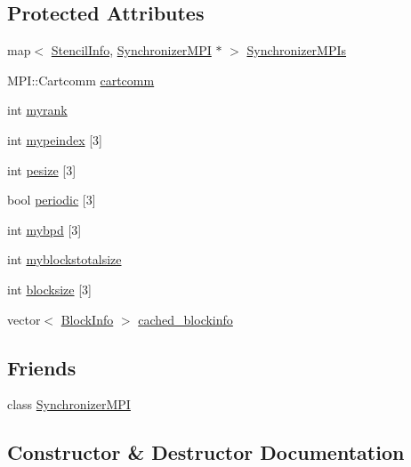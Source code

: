 \subsection*{Protected Attributes}
\begin{DoxyCompactItemize}
\item 
map$<$ \hyperlink{struct_stencil_info}{Stencil\+Info}, \hyperlink{class_synchronizer_m_p_i}{Synchronizer\+M\+P\+I} $\ast$ $>$ \hyperlink{class_grid_m_p_i_a2630fe6ea5a92bc46e122bce621143e5}{Synchronizer\+M\+P\+Is}
\item 
M\+P\+I\+::\+Cartcomm \hyperlink{class_grid_m_p_i_a11225861787838aeb43f9a6be7a5736b}{cartcomm}
\item 
int \hyperlink{class_grid_m_p_i_ac06426dbf8b56ab9f642f38b99a8ff58}{myrank}
\item 
int \hyperlink{class_grid_m_p_i_a18aa2c80d121cc50339949d8c3d0d547}{mypeindex} \mbox{[}3\mbox{]}
\item 
int \hyperlink{class_grid_m_p_i_ad23be40f0e498f46f215c36e0a00546c}{pesize} \mbox{[}3\mbox{]}
\item 
bool \hyperlink{class_grid_m_p_i_a5376cf349ce2d317bddc363907b22f69}{periodic} \mbox{[}3\mbox{]}
\item 
int \hyperlink{class_grid_m_p_i_a18238a13a4e9d9448ff9562560d5eadf}{mybpd} \mbox{[}3\mbox{]}
\item 
int \hyperlink{class_grid_m_p_i_a33aea82975cdfa2b3f017ee35fab6c5b}{myblockstotalsize}
\item 
int \hyperlink{class_grid_m_p_i_a9c0c291e8619844c31afa37d884e7805}{blocksize} \mbox{[}3\mbox{]}
\item 
vector$<$ \hyperlink{struct_block_info}{Block\+Info} $>$ \hyperlink{class_grid_m_p_i_ad5256ab6f6cef049008518d5d2ab7bdb}{cached\+\_\+blockinfo}
\end{DoxyCompactItemize}
\subsection*{Friends}
\begin{DoxyCompactItemize}
\item 
class \hyperlink{class_grid_m_p_i_a4d6cf8eb005be8cd74ca25544993aca2}{Synchronizer\+M\+P\+I}
\end{DoxyCompactItemize}


\subsection{Constructor \& Destructor Documentation}
\hypertarget{class_grid_m_p_i_ad515efd9d7bd9560eed5e958950cbb4d}{}
